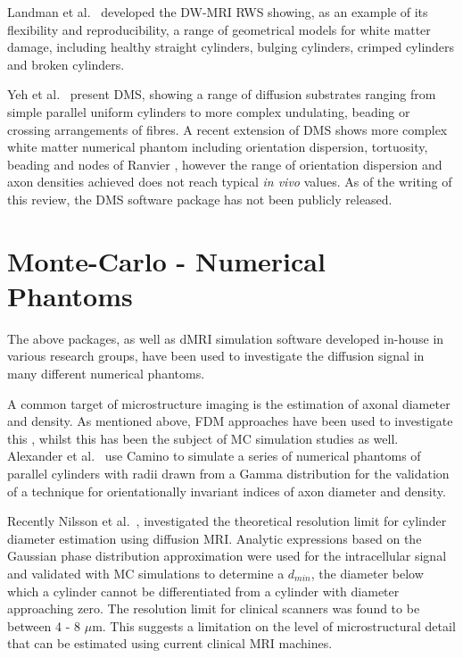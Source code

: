 Landman et al.\ \cite{Landman2010} developed the DW-MRI \ac{RWS} showing, as an example of its flexibility and reproducibility, a range of geometrical models for white matter damage, including healthy straight cylinders, bulging cylinders, crimped cylinders and broken cylinders.

Yeh et al.\ \cite{Yeh2013} present \ac{DMS}, showing a range of diffusion substrates ranging from simple parallel uniform cylinders to more complex undulating, beading or crossing arrangements of fibres.
A recent extension of \ac{DMS} shows more complex white matter numerical phantom including orientation dispersion, tortuosity, beading and nodes of Ranvier \cite{Ginsburger2018}, however the range of orientation dispersion and axon densities achieved does not reach typical \emph{in vivo} values.
As of the writing of this review, the \ac{DMS} software package has not been publicly released. 

\section{Monte-Carlo - Numerical Phantoms}
\label{sec:app_monte_carlo_numerical_phantoms}
The above packages, as well as \ac{dMRI} simulation software developed in-house in various research groups, have been used to investigate the diffusion signal in many different numerical phantoms. 

A common target of microstructure imaging is the estimation of axonal diameter and density.
As mentioned above, \ac{FDM} approaches have been used to investigate this \cite{Chin2002,Xu2014}, whilst this has been the subject of \ac{MC} simulation studies as well.
Alexander et al.\ \cite{Alexander2010} use Camino to simulate a series of numerical phantoms of parallel cylinders with radii drawn from a Gamma distribution for the validation of a technique for orientationally invariant indices of axon diameter and density.

Recently Nilsson et al.\ \cite{Nilsson2017}, investigated the theoretical resolution limit for cylinder diameter estimation using diffusion MRI. Analytic expressions based on the Gaussian phase distribution approximation \cite{Price1997} were used for the intracellular signal and validated with \ac{MC} simulations to determine a $d_{min}$, the diameter below which a cylinder cannot be differentiated from a cylinder with diameter approaching zero. The resolution limit for clinical scanners was found to be between 4 - 8 $\mu$m.
This suggests a limitation on the level of microstructural detail that can be estimated using current clinical \ac{MRI} machines.

